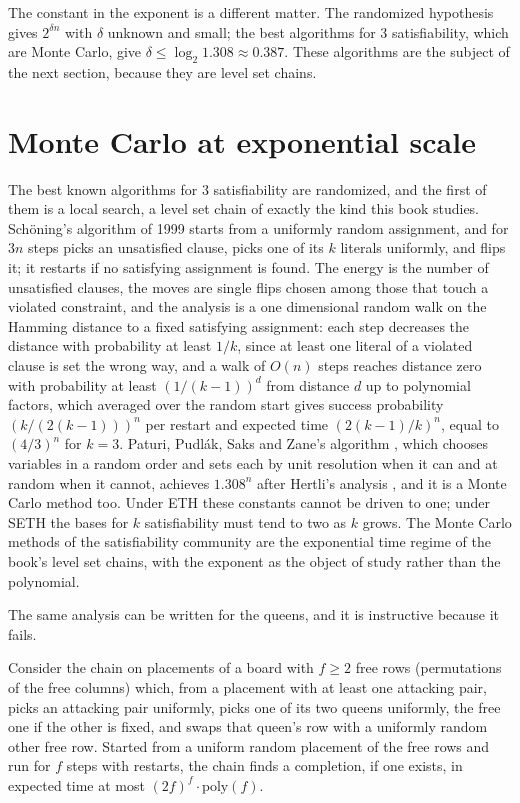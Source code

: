 The constant in the exponent is a different matter. The randomized hypothesis gives $2^{\delta n}$ with $\delta$ unknown and small; the best algorithms for $3$ satisfiability, which are Monte Carlo, give $\delta \le \log_2 1.308 \approx 0.387$. These algorithms are the subject of the next section, because they are level set chains.

\section{Monte Carlo at exponential scale}

The best known algorithms for $3$ satisfiability are randomized, and the first of them is a local search, a level set chain of exactly the kind this book studies. Sch\"oning's algorithm \cite{Schoning} of 1999 starts from a uniformly random assignment, and for $3n$ steps picks an unsatisfied clause, picks one of its $k$ literals uniformly, and flips it; it restarts if no satisfying assignment is found. The energy is the number of unsatisfied clauses, the moves are single flips chosen among those that touch a violated constraint, and the analysis is a one dimensional random walk on the Hamming distance to a fixed satisfying assignment: each step decreases the distance with probability at least $1/k$, since at least one literal of a violated clause is set the wrong way, and a walk of $O(n)$ steps reaches distance zero with probability at least $(1/(k-1))^{d}$ from distance $d$ up to polynomial factors, which averaged over the random start gives success probability $(k / (2(k-1)))^n$ per restart and expected time $(2(k-1)/k)^n$, equal to $(4/3)^n$ for $k = 3$. Paturi, Pudl\'ak, Saks and Zane's algorithm \cite{PPSZ}, which chooses variables in a random order and sets each by unit resolution when it can and at random when it cannot, achieves $1.308^n$ after Hertli's analysis \cite{Hertli}, and it is a Monte Carlo method too. Under ETH these constants cannot be driven to one; under SETH the bases for $k$ satisfiability must tend to two as $k$ grows. The Monte Carlo methods of the satisfiability community are the exponential time regime of the book's level set chains, with the exponent as the object of study rather than the polynomial.

The same analysis can be written for the queens, and it is instructive because it fails.

\begin{proposition}
\label{prop:schoening_queens}
Consider the chain on placements of a board with $f \ge 2$ free rows (permutations of the free columns) which, from a placement with at least one attacking pair, picks an attacking pair uniformly, picks one of its two queens uniformly, the free one if the other is fixed, and swaps that queen's row with a uniformly random other free row. Started from a uniform random placement of the free rows and run for $f$ steps with restarts, the chain finds a completion, if one exists, in expected time at most $(2 f)^{f} \cdot \mathrm{poly}(f)$.
\end{proposition}

